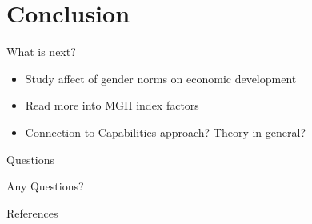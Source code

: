 \documentclass{beamer}
\begin{document}
\nocite{*}

\section{Conclusion}
\begin{frame}{What is next?}
  \begin{itemize}
  \item Study affect of gender norms on economic development
  \item Read more into MGII index factors
  \item Connection to Capabilities approach? Theory in general?
  \end{itemize}
\end{frame}
\begin{frame}{Questions}
  \fontsize{20pt}{7.2}\selectfont
  \begin{center}
    Any Questions?
  \end{center}
\end{frame}

\begin{frame}{References}
  \fontsize{6pt}{7.2}\selectfont
  
  
\end{frame}
\end{document}
